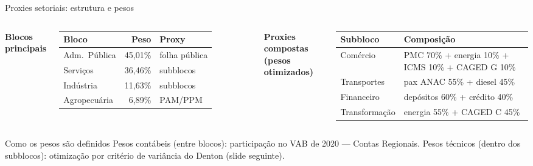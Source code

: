 \documentclass[aspectratio=169,11pt]{beamer}
\begin{document}
\begin{frame}{Proxies setoriais: estrutura e pesos}
\begin{columns}[T]
\textbf{Blocos principais}
\vspace{0.1cm}

\small
\begin{tabular}{p{2.1cm}rp{1.6cm}}
\toprule
\textbf{Bloco} & \textbf{Peso} & \textbf{Proxy} \\
\midrule
Adm.\ Pública & 45,01\% & folha pública \\
Serviços & 36,46\% & subblocos \\
Indústria & 11,63\% & subblocos \\
Agropecuária & 6,89\% & PAM/PPM \\
\bottomrule
\end{tabular}

\textbf{Proxies compostas (pesos otimizados)}
\vspace{0.1cm}

\small
\begin{tabular}{p{2.0cm}p{3.6cm}}
\toprule
\textbf{Subbloco} & \textbf{Composição} \\
\midrule
Comércio & PMC 70\% + energia 10\% + ICMS 10\% + CAGED G 10\% \\
Transportes & pax ANAC 55\% + diesel 45\% \\
Financeiro & depósitos 60\% + crédito 40\% \\
Transformação & energia 55\% + CAGED C 45\% \\
\bottomrule
\end{tabular}
\end{columns}

\vspace{0.3cm}
\begin{block}{Como os pesos são definidos}
Pesos contábeis (entre blocos): participação no VAB de 2020 — Contas Regionais. Pesos técnicos (dentro dos subblocos): otimização por critério de variância do Denton (slide seguinte).
\end{block}
\end{frame}
\end{document}
